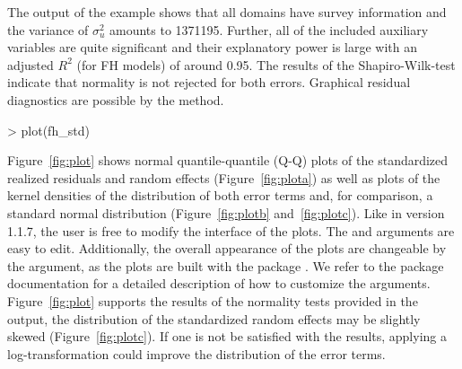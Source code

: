 The output of the example shows that all domains have survey information and the
variance of $\sigma_u^2$ amounts to 1371195. Further, all of the included
auxiliary variables are quite significant and their
explanatory power is large with an adjusted $R^2$ (for FH models) of around 0.95. The results of
the Shapiro-Wilk-test indicate that normality is not rejected for both errors.
Graphical residual diagnostics are possible by the  method.
\begin{example}
> plot(fh_std)
\end{example}
Figure~\ref{fig:plot} shows normal quantile-quantile (Q-Q) plots of the standardized
realized residuals and random effects (Figure~\ref{fig:plota}) as well as plots
of the kernel densities of the distribution of both error terms and, for comparison,
a standard normal distribution (Figure~\ref{fig:plotb} and~\ref{fig:plotc}). Like in  version 1.1.7, the user is free to modify the interface of the
plots. The  and  arguments are easy to edit. Additionally,
the overall appearance of the plots are changeable by the  argument,
as the plots are built with the  package \citep{Wickham2016}. We refer
to the package documentation for a detailed description of how to customize the
 arguments.
Figure~\ref{fig:plot} supports the results of the normality tests provided in
the  output, the distribution of the standardized random effects
may be slightly skewed (Figure~\ref{fig:plotc}). If one is not be satisfied
with the results, applying a log-transformation could improve the distribution
of the error terms.
%
